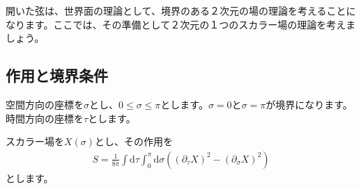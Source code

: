 \documentclass[report,paper=a4, fontsize=12pt, line_length=16cm, number_of_lines=34,dvipdfmx]{jlreq}
\numberwithin{equation}{chapter}
\numberwithin{equation}{section}
\newcommand{\del}{\partial}
\newcommand{\di}{\mathrm{d}}
\begin{document}
開いた弦は、世界面の理論として、境界のある２次元の場の理論を考えることになります。ここでは、その準備として２次元の１つのスカラー場の理論を考えましょう。

\subsection{作用と境界条件}

空間方向の座標を$\sigma$とし、$0\le \sigma \le \pi$とします。$\sigma=0$と$\sigma=\pi$が境界になります。時間方向の座標を$\tau$とします。

スカラー場を$X(\sigma)$とし、その作用を
\begin{align}
  S=\frac{1}{8\pi}\int \di \tau \int_{0}^{\pi}\di \sigma \left( (\del_{\tau}X)^2-(\del_{\sigma}X)^2 \right)
  \label{actionscalarwithboundary}
\end{align}
とします。
\end{document}
